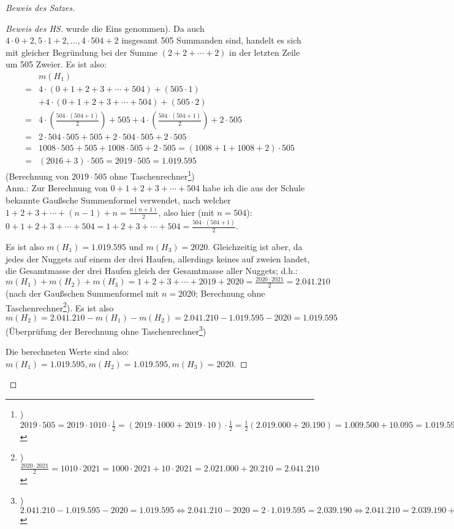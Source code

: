 \begin{proof}[Beweis des Satzes]
\begin{proof}[Beweis des HS]
        wurde die Eins genommen). Da auch $4\cdot0+2,5\cdot1+2,\ldots,4\cdot504+2$ insgesamt 505 Summanden sind, handelt es sich 
        mit gleicher Begründung bei der Summe $(2+2+\cdots+2)$ in der letzten Zeile um 505 Zweier. Es ist also:
        \begin{align*}
            &m(H_1)\\
            = &4\cdot(0+1+2+3+\cdots+504)+(505\cdot1)\\
            &+4\cdot(0+1+2+3+\cdots+504)+(505\cdot2)\\
            = &4\cdot\left(\frac{504\cdot(504+1)}{2}\right)+505
            +4\cdot\left(\frac{504\cdot(504+1)}{2}\right)+2\cdot 505\\
            =&2\cdot504\cdot505+505+2\cdot 504\cdot505+2\cdot505\\
            =&1008\cdot505+505+1008\cdot505+2\cdot505=(1008+1+1008+2)\cdot 505\\
            =&(2016+3)\cdot 505=2019\cdot505= 1.019.595
        \end{align*}
        (Berechnung von $2019\cdot 505$ ohne Taschenrechner\footnote{) $2019\cdot 505= 2019\cdot 1010 \cdot \frac12
        =(2019\cdot 1000+2019\cdot 10)\cdot \frac12=\frac12(2.019.000+20.190)=1.009.500+10.095=1.019.595$})\\
        Anm.: Zur Berechnung von $0+1+2+3+\cdots+504$ habe ich die aus der Schule bekannte Gaußsche Summenformel 
        verwendet, nach welcher $1+2+3+\cdots+(n-1)+n=\frac{n(n+1)}{2}$, also hier (mit $n=504$): 
        $0+1+2+3+\cdots+504=1+2+3+\cdots+504=\frac{504\cdot(504+1)}{2}$.

        Es ist also $m(H_1)= 1.019.595$ und $m(H_3)=2020$. Gleichzeitig ist aber, da jedes der Nuggets auf einem der 
        drei Haufen, allerdings keines auf zweien landet, die Gesamtmasse der drei Haufen gleich der Gesamtmasse 
        aller Nuggets; d.h.: $m(H_1)+m(H_2)+m(H_3)=1+2+3+\cdots+2019+2020=\frac{2020\cdot2021}{2}=2.041.210$ (nach der 
        Gaußschen Summenformel mit $n=2020$; Berechnung ohne Taschenrechner\footnote{) $\frac{2020\cdot2021}{2}=1010
        \cdot2021=1000\cdot2021+10\cdot2021=2.021.000+20.210=2.041.210$}). Es ist also $m(H_2)=2.041.210-m(H_1)-m(H_2) 
        = 2.041.210-1.019.595-2020=1.019.595$ (Überprüfung der Berechnung ohne Taschenrechner\footnote{) $2.041.210
        -1.019.595-2020=1.019.595\Leftrightarrow 2.041.210-2020=2\cdot 1.019.595=2.039.190\Leftrightarrow 2.041.210
        =2.039.190+2020=2.039.210+2000=2.041.210$})

        Die berechneten Werte sind also: $m(H_1)=1.019.595, m(H_2)=1.019.595, m(H_3)=2020$.


\end{proof}
\end{proof}
